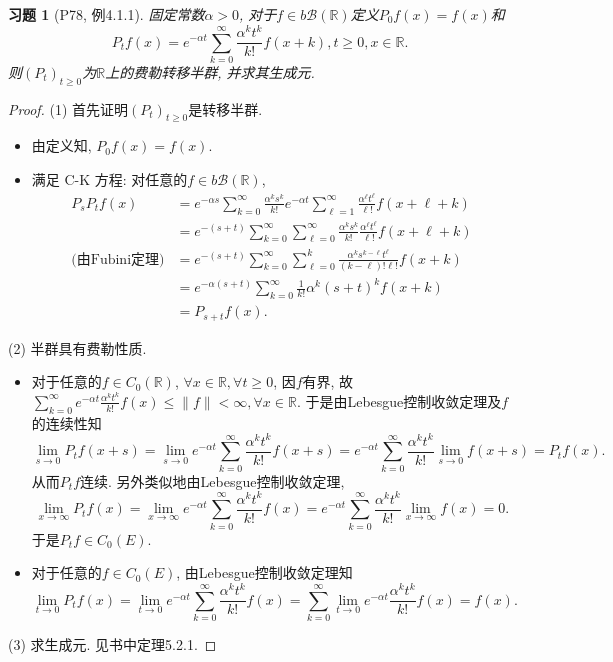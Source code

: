\documentclass[UTF8,ondside]{ctexart}
\newtheorem{exercise}{习题}[section]
\newcommand{\h}{\mathscr}
\newcommand{\kx}{\mathbb}
\numberwithin{equation}{section}
\begin{document}
	\begin{exercise}[P78, 例4.1.1]
		固定常数$\alpha > 0$, 对于$f\in b\h B(\kx R)$定义$P_0f(x)=f(x)$和
		\[
			P_tf(x)=e^{-\alpha t}\sum_{k=0}^\infty \frac{\alpha^k t^k}{k!}f(x+k),t\geq 0,x\in\kx R.
		\]
		则$(P_t)_{t\geq 0}$为$\kx R$上的费勒转移半群, 并求其生成元. 
	\end{exercise}
	\begin{proof}
		(1) 首先证明$(P_t)_{t\geq 0}$是转移半群.
		\begin{itemize}
			\item 由定义知, $P_0f(x)=f(x)$.
			\item 满足 C-K 方程: 对任意的$f\in b\h B(\kx R)$,
			\[
				\begin{aligned}
				P_sP_t f(x)&=e^{-\alpha s}\sum_{k=0}^\infty\frac{\alpha^k s^k}{k!}e^{-\alpha t}\sum_{\ell=1}^\infty\frac{\alpha^\ell t^\ell}{\ell !}f(x+ \ell + k)\\
				&=e^{-(s+t)}\sum_{k=0}^\infty\sum_{\ell = 0}^\infty \frac{\alpha^k s^k}{k!}\frac{\alpha^\ell t^\ell}{\ell !}f(x+\ell + k)\\
				\text{(由Fubini定理)} &=e^{-(s+t)}\sum_{k=0}^\infty \sum_{\ell = 0}^k\frac{\alpha^k s^{k-\ell}t^\ell}{(k-\ell)!\ell !}f(x+k)\\
				&= e^{-\alpha(s+t)}\sum_{k=0}^\infty \frac{1}{k!}\alpha^k (s+t)^k f(x+k)\\
				&= P_{s+t} f(x).
				\end{aligned}
			\]
		\end{itemize}

		(2) 半群具有费勒性质. 
		\begin{itemize}
			\item 对于任意的$f\in C_0(\kx R)$, $\forall x\in\kx R,\forall t\geq 0$, 因$f$有界, 故$\sum_{k=0}^\infty e^{-\alpha t}\frac{\alpha^k t^k}{k!}f(x)\leq \|f\|<\infty, \forall x\in\kx R$. 于是由Lebesgue控制收敛定理及$f$的连续性知
			\[
				\lim_{s\rightarrow 0}P_t f(x+s)=\lim_{s\rightarrow 0}e^{-\alpha t}\sum_{k=0}^\infty\frac{\alpha^k t^k}{k!}f(x+s)=e^{-\alpha t}\sum_{k=0}^\infty  \frac{\alpha^k t^k}{k!}\lim_{s\rightarrow 0} f(x+s)=P_t f(x).
			\]
			从而$P_t f$连续. 另外类似地由Lebesgue控制收敛定理,
			\[
				\lim_{x\rightarrow\infty}P_t f(x)=\lim_{x\rightarrow\infty}e^{-\alpha t}\sum_{k=0}^\infty \frac{\alpha^k t^k}{k!}f(x)=e^{-\alpha t}\sum_{k=0}^\infty \frac{\alpha^k t^k}{k!}\lim_{x\rightarrow\infty}f(x) = 0.
			\]
			于是$P_t f\in C_0(E)$.
			\item 对于任意的$f\in C_0(E)$, 由Lebesgue控制收敛定理知
			\[
				\lim_{t\rightarrow 0}P_t f(x) = \lim_{t\rightarrow 0} e^{-\alpha t}\sum_{k=0}^\infty \frac{\alpha^k t^k}{k!} f(x) = \sum_{k=0}^\infty \lim_{t\rightarrow 0}e^{-\alpha t}\frac{\alpha^k t^k}{k!}f(x)=f(x).
			\]
		\end{itemize}

		(3) 求生成元. 见书中定理5.2.1.
	\end{proof}
\end{document}
